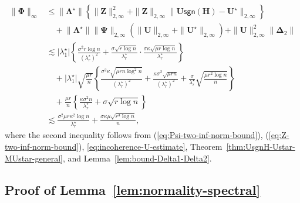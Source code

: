 \begin{align*}
\big\|\bm{\Phi}\big\|_{\infty} & \leq\big\|\bm{\Lambda}^{\star}\big\|\left\{ \|\bm{Z}\|_{2,\infty}^{2}+\|\bm{Z}\|_{2,\infty}\big\|\bm{U}\mathsf{sgn}(\bm{H})-\bm{U}^{\star}\big\|_{2,\infty}\right\} \\
 & \quad+\big\|\bm{\Lambda}^{\star}\big\|\|\bm{\Psi}\|_{2,\infty}\left(\big\|\bm{U}\big\|_{2,\infty}+\|\bm{U}^{\star}\|_{2,\infty}\right)+\|\bm{U}\|_{2,\infty}^{2}\|\bm{\Delta}_{2}\|\\
 & \lesssim\big|\lambda_{1}^{\star}\big|\left\{ \frac{\sigma^{2}r\log n}{(\lambda_{r}^{\star})^{2}}+\frac{\sigma\sqrt{r\log n}}{\lambda_{r}^{\star}}\cdot\frac{\sigma\kappa\sqrt{\mu r\log n}}{\lambda_{r}^{\star}}\right\} \\
 & \quad+\big|\lambda_{1}^{\star}\big|\sqrt{\frac{\mu r}{n}}\left\{ \frac{\sigma^{2}\kappa\sqrt{\mu rn\log^{2}n}}{(\lambda_{r}^{\star})^{2}}+\frac{\kappa\sigma^{2}\sqrt{\mu rn}}{(\lambda_{r}^{\star})^{2}}+\frac{\sigma}{\lambda_{r}^{\star}}\sqrt{\frac{\mu r^{2}\log n}{n}}\right\} \\
 & \quad+\frac{\mu r}{n}\left\{ \frac{\kappa\sigma^{2}n}{\lambda_{r}^{\star}}+\sigma\sqrt{r\log n}\right\} \\
 & \lesssim\frac{\sigma^{2}\mu r\kappa^{2}\log n}{\lambda_{r}^{\star}}+\frac{\sigma\kappa\mu\sqrt{r^{3}\log n}}{n},
\end{align*}
%
where the second inequality follows from (\ref{eq:Psi-two-inf-norm-bound}),
(\ref{eq:Z-two-inf-norm-bound}), \eqref{eq:incoherence-U-estimate}, Theorem~\ref{thm:UsgnH-Ustar-MUstar-general}, and Lemma~\ref{lem:bound-Delta1-Delta2}. 

%






\subsection{Proof of Lemma~\ref{lem:normality-spectral}}
\label{sec:proof-lem:normality-spectral}

